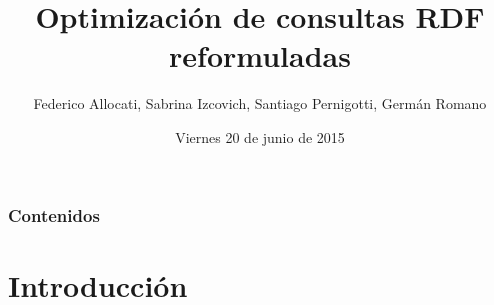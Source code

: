 \documentclass{beamer}
\title[Presentación del TP2]{Optimización de consultas RDF reformuladas} %
\author{Federico Allocati, Sabrina Izcovich, Santiago Pernigotti, Germán Romano} %
\institute[] %
{
Departamento de Computación\\ %
\medskip
}
\date{Viernes 20 de junio de 2015} %
\begin{document}
\begin{frame}
\titlepage %
\end{frame}

\begin{frame}
\frametitle{Contenidos} %
\tableofcontents %
\end{frame}


\section{Introducción} %
\begin{frame}


\end{frame}
\end{document}
